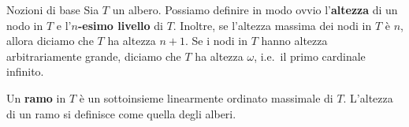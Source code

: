 \documentclass{beamer}
\theoremstyle{num.custom-title}
\theoremstyle{custom-title}
\DeclareMathOperator{\type}{type}
\DeclareMathOperator{\height}{height}
\DeclareMathOperator{\down}{\downarrow}
\newcommand*{\defeq}{\mathrel{\rlap{%
                     \raisebox{0.3ex}{$\cdot$}}%
                     \raisebox{-0.3ex}{$\cdot$}}%
                     =}
\renewcommand{\emph}[1]{\textbf{#1}}
\begin{document}


\begin{frame}{Nozioni di base}
Sia $T$ un albero. Possiamo definire in modo ovvio l'\emph{altezza} di un nodo in $T$ e l'\emph{$n$-esimo livello} di $T$. Inoltre, se l'altezza massima dei nodi in $T$ è $n$, allora diciamo che $T$ ha altezza $n+1$. Se i nodi in $T$ hanno altezza arbitrariamente grande, diciamo che $T$ ha altezza $\omega$, i.e.\ il primo cardinale infinito.

\begin{definition}
Un \emph{ramo} in $T$ è un sottoinsieme linearmente ordinato massimale di $T$. L'altezza di un ramo si definisce come quella degli alberi.
\end{definition}

\end{frame}
\end{document}
